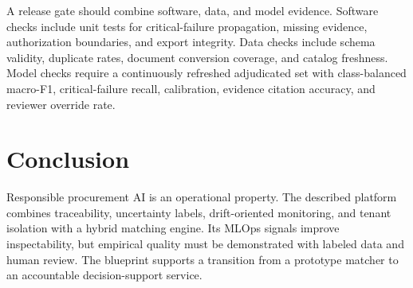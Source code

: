 \documentclass[conference]{IEEEtran}
\begin{document}
A release gate should combine software, data, and model evidence. Software checks include unit tests for critical-failure propagation, missing evidence, authorization boundaries, and export integrity. Data checks include schema validity, duplicate rates, document conversion coverage, and catalog freshness. Model checks require a continuously refreshed adjudicated set with class-balanced macro-F1, critical-failure recall, calibration, evidence citation accuracy, and reviewer override rate.

\section{Conclusion}
Responsible procurement AI is an operational property. The described platform combines traceability, uncertainty labels, drift-oriented monitoring, and tenant isolation with a hybrid matching engine. Its MLOps signals improve inspectability, but empirical quality must be demonstrated with labeled data and human review. The blueprint supports a transition from a prototype matcher to an accountable decision-support service.



\end{document}
